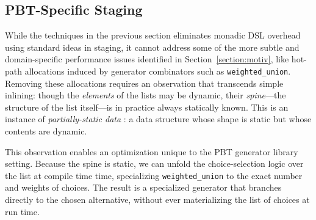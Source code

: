 \documentclass[acmsmall]{acmart}
\theoremstyle{definition}
\begin{document}
\subsection{PBT-Specific Staging}
While the techniques in the previous section eliminates monadic
DSL overhead using standard ideas in staging, it cannot address some of the
more subtle and domain-specific performance issues identified in Section~\ref{section:motiv},
like hot-path allocations induced by generator combinators such as \texttt{weighted\_union}.
Removing these allocations requires an observation that transcends simple 
inlining: though the \emph{elements} of the lists may be dynamic, their
\emph{spine}---the structure of the list itself---is in practice always statically
known. This is an instance of \emph{partially-static data} \cite{partially-static}:
a data structure whose shape is static but whose contents are dynamic.

This observation enables an optimization unique to the PBT generator library setting.
Because the spine is static, we can unfold the choice-selection
logic over the list at compile time time, specializing \texttt{weighted\_union} to the exact number
and weights of choices. The result is a specialized generator that branches directly to the chosen
alternative, without ever materializing the list of choices at run time.




\end{document}
